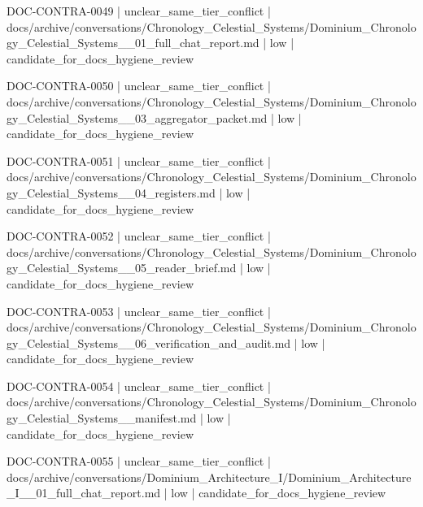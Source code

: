 \documentclass[11pt,a4paper]{report}
\begin{document}
{\small\ttfamily\raggedright DOC-\allowbreak{}CONTRA-\allowbreak{}0049 | unclear\_same\_tier\_conflict | docs/\allowbreak{}archive/\allowbreak{}conversations/\allowbreak{}Chronology\_Celestial\_Systems/\allowbreak{}Dominium\_Chronology\_Celestial\_Systems\_\_01\_full\_chat\_report.\allowbreak{}md | low | candidate\_for\_docs\_hygiene\_review\par}
{\small\ttfamily\raggedright DOC-\allowbreak{}CONTRA-\allowbreak{}0050 | unclear\_same\_tier\_conflict | docs/\allowbreak{}archive/\allowbreak{}conversations/\allowbreak{}Chronology\_Celestial\_Systems/\allowbreak{}Dominium\_Chronology\_Celestial\_Systems\_\_03\_aggregator\_packet.\allowbreak{}md | low | candidate\_for\_docs\_hygiene\_review\par}
{\small\ttfamily\raggedright DOC-\allowbreak{}CONTRA-\allowbreak{}0051 | unclear\_same\_tier\_conflict | docs/\allowbreak{}archive/\allowbreak{}conversations/\allowbreak{}Chronology\_Celestial\_Systems/\allowbreak{}Dominium\_Chronology\_Celestial\_Systems\_\_04\_registers.\allowbreak{}md | low | candidate\_for\_docs\_hygiene\_review\par}
{\small\ttfamily\raggedright DOC-\allowbreak{}CONTRA-\allowbreak{}0052 | unclear\_same\_tier\_conflict | docs/\allowbreak{}archive/\allowbreak{}conversations/\allowbreak{}Chronology\_Celestial\_Systems/\allowbreak{}Dominium\_Chronology\_Celestial\_Systems\_\_05\_reader\_brief.\allowbreak{}md | low | candidate\_for\_docs\_hygiene\_review\par}
{\small\ttfamily\raggedright DOC-\allowbreak{}CONTRA-\allowbreak{}0053 | unclear\_same\_tier\_conflict | docs/\allowbreak{}archive/\allowbreak{}conversations/\allowbreak{}Chronology\_Celestial\_Systems/\allowbreak{}Dominium\_Chronology\_Celestial\_Systems\_\_06\_verification\_and\_audit.\allowbreak{}md | low | candidate\_for\_docs\_hygiene\_review\par}
{\small\ttfamily\raggedright DOC-\allowbreak{}CONTRA-\allowbreak{}0054 | unclear\_same\_tier\_conflict | docs/\allowbreak{}archive/\allowbreak{}conversations/\allowbreak{}Chronology\_Celestial\_Systems/\allowbreak{}Dominium\_Chronology\_Celestial\_Systems\_\_manifest.\allowbreak{}md | low | candidate\_for\_docs\_hygiene\_review\par}
{\small\ttfamily\raggedright DOC-\allowbreak{}CONTRA-\allowbreak{}0055 | unclear\_same\_tier\_conflict | docs/\allowbreak{}archive/\allowbreak{}conversations/\allowbreak{}Dominium\_Architecture\_I/\allowbreak{}Dominium\_Architecture\_I\_\_01\_full\_chat\_report.\allowbreak{}md | low | candidate\_for\_docs\_hygiene\_review\par}
\end{document}
